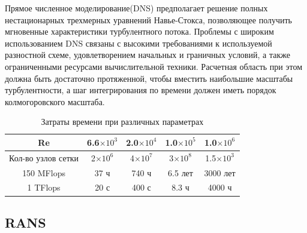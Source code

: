	Прямое численное моделирование(DNS) предполагает решение полных нестационарных трехмерных уравнений Навье-Стокса, позволяющее получить мгновенные характеристики турбулентного потока. Проблемы с широким использованием DNS связаны с высокими требованиями к используемой разностной схеме, удовлетворением начальных и граничных условий, а также ограниченными ресурсами вычислительной техники. Расчетная область при этом должна быть достаточно протяженной, чтобы вместить наибольшие масштабы турбулентности, а шаг интегрирования по времени должен иметь порядок колмогоровского масштаба.
	
	\begin{table}[H]
		\begin{center}
			\begin{tabular}{|c|c|c|c|c|}
				\hline
				Re & 6.6$\times10^3$ & 2.0$\times10^4$ & 1.0$\times10^5$ & 1.0$\times10^6$\\
				\hline
				Кол-во узлов сетки & 2$\times10^6$ & 4$\times10^7$ & 3$\times10^8$ & 1.5$\times10^3$\\
				\hline
				150 MFlops & 37 ч & 740 ч & 6.5 лет & 3000 лет\\
				\hline
				1 TFlops & 20 с & 400 с & 8.3 ч & 4000 ч\\
				\hline
			\end{tabular}
		\end{center}
		\caption{Затраты времени при различных параметрах}
	\end{table}

\subsection{RANS}
	
